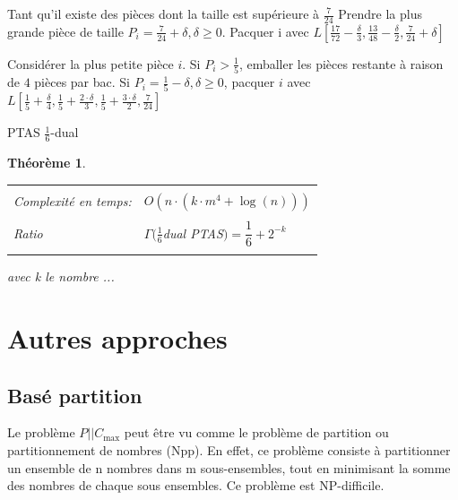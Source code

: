 \documentclass[a4paper,12pt]{report}
\theoremstyle{plain}				%
\newtheorem{theoreme}{Théorème}	%
\theoremstyle{definition}				%
\newcommand\problemGrahamP{$P||C_{\max}$\xspace}
\newcommand{\tdi}[1]{\todo[inline]{{#1}}{}}
\begin{document}
\begin{algorithm}[H]
Tant qu'il existe des pièces dont la taille est supérieure à $\frac{7}{24}$
Prendre la plus grande pièce de taille $P_i = \frac{7}{24}+\delta, \delta \geq 0$.
Pacquer i avec 
$L[\frac{17}{72}-\frac{\delta}{3}, 
   \frac{13}{48}-\frac{\delta}{2}, 
   \frac{7}{24}+\delta]$ 
   
Considérer la plus petite pièce $i$.
Si $P_i>\frac{1}{5}$, emballer les pièces restante à raison de $4$ pièces par bac.
Si $P_i=\frac{1}{5}-\delta, \delta \geq 0$, pacquer $i$ avec
$L[\frac{1}{5}+\frac{\delta}{4}, 
   \frac{1}{5}+\frac{2 \cdot \delta}{3}, 
   \frac{1}{5}+\frac{3 \cdot \delta}{2},
   \frac{7}{24}]$

\BlankLine %



\caption{PTAS $\frac{1}{6}$-dual}
\label{algo:PTASDual1_6}
\end{algorithm}

\bigskip

\begin{theoreme}
\begin{flushleft}
\begin{tabular}{|p{8cm}p{6cm}|}
\hline
& \\
Complexité en temps:& $O(n \cdot (k \cdot m^4 + \log(n)))$
\\	%
& \\
Ratio & $\Gamma(\frac{1}{6}$dual PTAS$) = \dfrac{1}{6} + 2^{-k}$
\\
& \\
\hline
\end{tabular}
\end{flushleft}
avec k le nombre ...
\end{theoreme}
\tdi{FCO: Trouver k !}







\section{Autres approches}

\subsection{Basé partition}
Le problème \problemGrahamP peut être vu comme le problème de partition ou partitionnement de nombres (Npp). 
En effet, ce problème consiste à partitionner un ensemble de n nombres dans m sous-ensembles, 
tout en minimisant la somme des nombres de chaque sous ensembles.
Ce problème est NP-difficile.  
\end{document}
